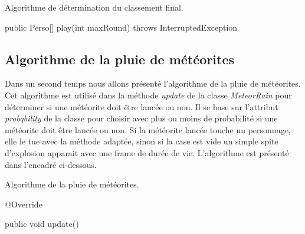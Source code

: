 \begin{algorithm}
\caption[\emph{Algorithme de détermination du classement final}]{\label{algo}Algorithme de détermination du classement final.}

public Perso[] play\?(int maxRound) throws InterruptedException 
\end{algorithm}
\bigskip


\subsection{Algorithme de la pluie de météorites}

Dans un second temps nous allons présenté l'algorithme de la pluie de météorites. Cet algorithme est utilisé dans la méthode \emph{update} de la classe \emph{MeteorRain} pour déterminer si une météorite doit être lancée ou non. Il se base sur l'attribut \emph{probqbility} de la classe pour choisir avec plus ou moins de probabilité si une météorite doit être lancée ou non. Si la météorite lancée touche un personnage, elle le tue avec la méthode adaptée, sinon si la case est vide un simple spite d'explosion apparait avec une frame de durée de vie. L'algorithme est présenté dans l'encadré ci-dessous.

\begin{algorithm}
  \caption[\emph{Algorithme de la pluie de météorites}]{\label{algo2}Algorithme de la pluie de météorites.}

  @Override

  public void update\?() 
\end{algorithm}